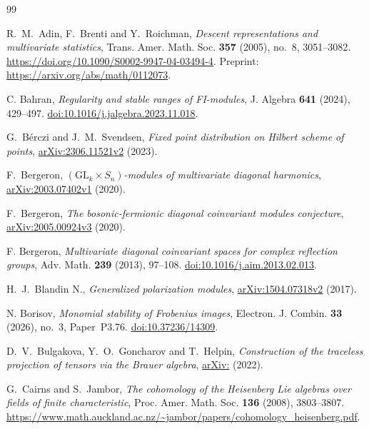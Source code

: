 \begin{thebibliography}{99}

R.~M.~Adin, F.~Brenti and Y.~Roichman,
\emph{Descent representations and multivariate statistics},
Trans. Amer. Math. Soc. \textbf{357} (2005), no.~8, 3051--3082.
\url{https://doi.org/10.1090/S0002-9947-04-03494-4}.
Preprint: \url{https://arxiv.org/abs/math/0112073}.

C. Bahran,
\emph{Regularity and stable ranges of FI-modules},
J. Algebra \textbf{641} (2024), 429--497.
\href{https://doi.org/10.1016/j.jalgebra.2023.11.018}{doi:10.1016/\allowbreak j.jalgebra.2023.11.018}.

G.~B\'erczi and J.~M.~Svendsen,
\emph{Fixed point distribution on Hilbert scheme of points},
\href{https://arxiv.org/abs/2306.11521v2}{arXiv:\allowbreak 2306.11521v2} (2023).

F.~Bergeron,
\emph{$(\mathrm{GL}_k\times S_n)$-modules of multivariate
diagonal harmonics},
\href{https://arxiv.org/abs/2003.07402v1}{arXiv:\allowbreak 2003.07402v1} (2020).

F.~Bergeron,
\emph{The bosonic-fermionic diagonal coinvariant modules conjecture},
\href{https://arxiv.org/abs/2005.00924v3}{arXiv:\allowbreak 2005.00924v3} (2020).

F. Bergeron,
\emph{Multivariate diagonal coinvariant spaces for complex reflection groups},
Adv. Math. \textbf{239} (2013), 97--108.
\href{https://doi.org/10.1016/j.aim.2013.02.013}{doi:10.1016/j.aim.2013.02.013}.

H.~J.~Blandin N.,
\emph{Generalized polarization modules},
\href{https://arxiv.org/abs/1504.07318v2}{arXiv:\allowbreak 1504.07318v2} (2017).

N. Borisov,
\emph{Monomial stability of Frobenius images},
Electron. J. Combin. \textbf{33} (2026), no.~3, Paper~P3.76.
\href{https://doi.org/10.37236/14309}{doi:10.37236/14309}.

D.~V.~Bulgakova, Y.~O.~Goncharov and T.~Helpin,
\emph{Construction of the traceless projection of tensors
via the Brauer algebra},
\href{https://arxiv.org/abs/2212.14496}{arXiv:} (2022).

G.~Cairns and S.~Jambor,
\emph{The cohomology of the Heisenberg Lie algebras over fields of finite
characteristic}, Proc. Amer. Math. Soc. \textbf{136} (2008), 3803--3807.
\url{https://www.math.auckland.ac.nz/~jambor/papers/cohomology_heisenberg.pdf}.


\end{thebibliography}

